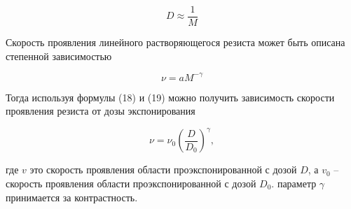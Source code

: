 \begin{equation}
D\approx \frac{1}{M}
\label{eq:A18}
\end{equation}

Скорость проявления линейного растворяющегося резиста может быть описана степенной зависимостью \cite{16,22,23}

\begin{equation}
\nu=aM^{-\gamma}
\label{eq:A19}
\end{equation}

Тогда используя формулы (18) и (19) можно получить зависимость скорости проявления резиста от дозы экспонирования 

\begin{equation}
\nu=\nu_0\left(\frac{D}{D_0}\right)^\gamma,
\label{eq:A20}
\end{equation}

где $v$ это скорость проявления области проэкспонированной с дозой $D$, а $v_0$ -- скорость проявления области проэкспонированной с дозой $D_0$. параметр $\gamma$ принимается за контрастность. 


